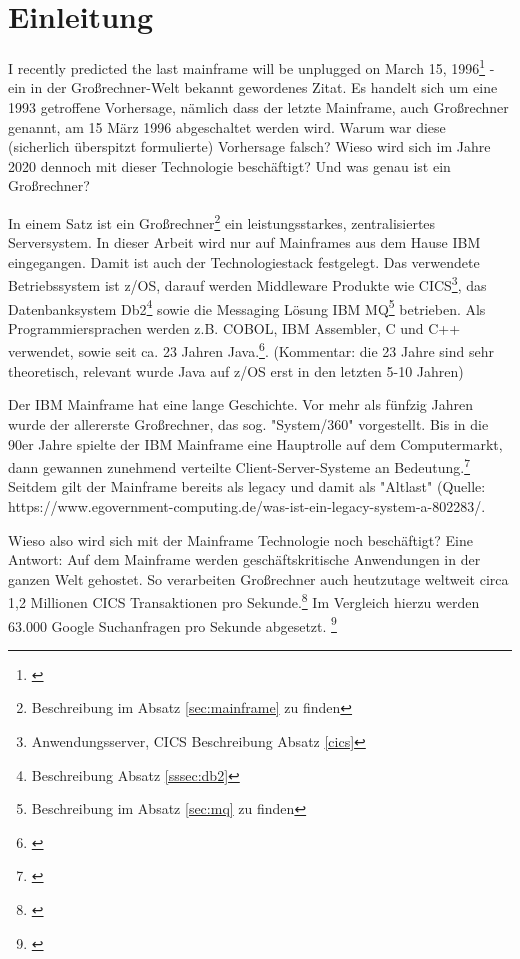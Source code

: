 \chapter{Einleitung}\label{ch:einleitung}
\glqq I recently predicted the last mainframe will be unplugged on March 15, 1996\grqq\footnote{\cite{Alsop.1993}} - ein in der Großrechner-Welt bekannt gewordenes Zitat.
Es handelt sich um eine 1993 getroffene Vorhersage, nämlich dass der letzte Mainframe, auch Großrechner genannt, am 15 März 1996 abgeschaltet werden wird.
Warum war diese (sicherlich überspitzt formulierte) Vorhersage falsch? 
Wieso wird sich im Jahre 2020 dennoch mit dieser Technologie beschäftigt? 
Und was genau ist ein Großrechner?

In einem Satz ist ein Großrechner\footnote{Beschreibung im Absatz \ref{sec:mainframe} zu finden} ein leistungsstarkes, zentralisiertes Serversystem.
In dieser Arbeit wird nur auf Mainframes aus dem Hause IBM eingegangen.
Damit ist auch der Technologiestack festgelegt.
Das verwendete Betriebssystem ist z/OS, darauf werden Middleware Produkte wie CICS\footnote{Anwendungsserver, CICS Beschreibung Absatz \ref{cics}}, das Datenbanksystem Db2\footnote{ Beschreibung Absatz \ref{sssec:db2}} sowie die Messaging Lösung \glqq IBM MQ\grqq{}\footnote{Beschreibung im Absatz \ref{sec:mq} zu finden} betrieben.
Als Programmiersprachen werden z.B. COBOL, IBM Assembler, C und C++ verwendet, sowie seit ca. 23 Jahren Java.\footnote{\cite{Steegmans.2003}}. (Kommentar: die 23 Jahre sind sehr theoretisch, relevant wurde Java auf z/OS erst in den letzten 5-10 Jahren)

Der IBM Mainframe hat eine lange Geschichte.
Vor mehr als fünfzig Jahren wurde der allererste Großrechner, das sog. "System/360" vorgestellt.
Bis in die 90er Jahre spielte der IBM Mainframe eine Hauptrolle auf dem Computermarkt, dann gewannen zunehmend verteilte Client-Server-Systeme an Bedeutung.\footnote{\cite{Ceruzzi.2003}}
Seitdem gilt der Mainframe bereits als \glqq  legacy\grqq{} und damit als "Altlast" (Quelle: https://www.egovernment-computing.de/was-ist-ein-legacy-system-a-802283/.

Wieso also wird sich mit der Mainframe Technologie noch beschäftigt? Eine Antwort: Auf dem Mainframe werden geschäftskritische Anwendungen in der ganzen Welt gehostet.
So verarbeiten Großrechner auch heutzutage weltweit circa 1,2 Millionen CICS Transaktionen pro Sekunde.\footnote{\cite{IBM.2019}}
Im Vergleich hierzu werden 63.000 Google Suchanfragen pro Sekunde abgesetzt. \footnote{\cite{Sullivan.2016}}

